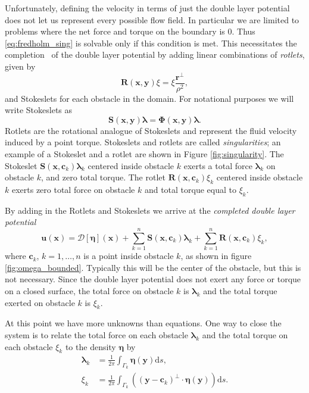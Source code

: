 Unfortunately, defining the velocity in terms of just the double layer potential does not let us represent every possible flow field. In particular we are limited to problems where the net force and torque on the boundary is 0. Thus \eqref{eq:fredholm_sing} is solvable only if this condition is met. This necessitates the completion~\cite{Power1993, Power1987} of the double layer potential by adding linear combinations of \textit{rotlets}, given by
\begin{equation}
	\mathbf{R}(\mathbf{x},\mathbf{y})\xi = \xi\frac{\mathbf{r}^\perp}{\rho^2},
\end{equation}
and Stokeslets for each obstacle in the domain. For notational purposes we will write Stokeslets as
\[ \mathbf{S}(\mathbf{x},\mathbf{y})\pmb{\lambda} = \pmb{\Phi}(\mathbf{x},\mathbf{y})\pmb{\lambda}.\]
Rotlets are the rotational analogue of Stokeslets and represent the fluid velocity induced by a point torque. Stokeslets and rotlets are called \textit{singularities}; an example of a Stokeslet and a rotlet are shown in Figure \ref{fig:singularity}. The Stokeslet $\mathbf{S}(\mathbf{x},\mathbf{c}_k)\pmb{\lambda}_k$ centered  inside obstacle $k$ exerts a total force $\pmb{\lambda}_k$ on obstacle $k$, and zero total torque. The rotlet $\mathbf{R}(\mathbf{x},\mathbf{c}_k)\xi_k$ centered inside obstacle $k$ exerts zero total force on obstacle $k$ and total torque equal to $\xi_k$. 

By adding in the Rotlets and Stokeslets we arrive at the \textit{completed double layer potential}
\begin{equation}\label{eq:dlp_complete}
	 \mathbf{u}(\mathbf{x}) = \mathcal{D}[\pmb{\eta}](\mathbf{x}) + \sum\limits_{k=1}^n\mathbf{S}(\mathbf{x},\mathbf{c}_k)\pmb{\lambda}_k + \sum\limits_{k=1}^n \mathbf{R}(\mathbf{x},\mathbf{c}_k)\xi_k,\end{equation}
where $\mathbf{c}_k$, $k=1,\hdots,n$ is a point inside obstacle $k$, as shown in figure \ref{fig:omega_bounded}. Typically this will be the center of the obstacle, but this is not necessary. Since  the double layer potential does not exert any force or torque on a closed surface, the total force on obstacle $k$ is $\pmb{\lambda}_k$ and the total torque exerted on obstacle $k$ is $\xi_k$. 



At this point we have more unknowns than equations. One way to close the system is to relate the total force on each obstacle $\pmb{\lambda}_k$ and the total torque on each obstacle $\xi_k$ to the density $\pmb{\eta}$ by
\begin{subequations}\label{eq:constraints}
\begin{align}
	\pmb{\lambda}_k &= \frac{1}{2\pi} \int_{\Gamma_k} \pmb{\eta}(\mathbf{y}) \text{d}s,\label{eq:force}\\
	\xi_k &= \frac{1}{2\pi}\int_{\Gamma_k}\left( (\mathbf{y} - \mathbf{c}_k)^\perp \cdot\pmb{\eta}(\mathbf{y})\right)\text{d}s. \label{eq:torque}
\end{align}
\end{subequations}

